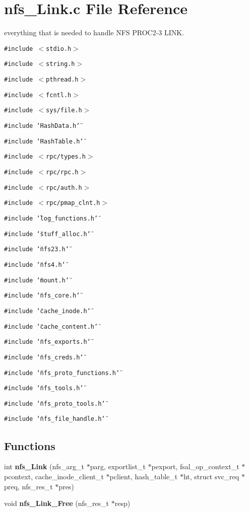\section{nfs\_\-Link.c File Reference}
\label{nfs__Link_8c}
everything that is needed to handle NFS PROC2-3 LINK. 

{\tt \#include $<$stdio.h$>$}\par
{\tt \#include $<$string.h$>$}\par
{\tt \#include $<$pthread.h$>$}\par
{\tt \#include $<$fcntl.h$>$}\par
{\tt \#include $<$sys/file.h$>$}\par
{\tt \#include \char`\"{}Hash\-Data.h\char`\"{}}\par
{\tt \#include \char`\"{}Hash\-Table.h\char`\"{}}\par
{\tt \#include $<$rpc/types.h$>$}\par
{\tt \#include $<$rpc/rpc.h$>$}\par
{\tt \#include $<$rpc/auth.h$>$}\par
{\tt \#include $<$rpc/pmap\_\-clnt.h$>$}\par
{\tt \#include \char`\"{}log\_\-functions.h\char`\"{}}\par
{\tt \#include \char`\"{}stuff\_\-alloc.h\char`\"{}}\par
{\tt \#include \char`\"{}nfs23.h\char`\"{}}\par
{\tt \#include \char`\"{}nfs4.h\char`\"{}}\par
{\tt \#include \char`\"{}mount.h\char`\"{}}\par
{\tt \#include \char`\"{}nfs\_\-core.h\char`\"{}}\par
{\tt \#include \char`\"{}cache\_\-inode.h\char`\"{}}\par
{\tt \#include \char`\"{}cache\_\-content.h\char`\"{}}\par
{\tt \#include \char`\"{}nfs\_\-exports.h\char`\"{}}\par
{\tt \#include \char`\"{}nfs\_\-creds.h\char`\"{}}\par
{\tt \#include \char`\"{}nfs\_\-proto\_\-functions.h\char`\"{}}\par
{\tt \#include \char`\"{}nfs\_\-tools.h\char`\"{}}\par
{\tt \#include \char`\"{}nfs\_\-proto\_\-tools.h\char`\"{}}\par
{\tt \#include \char`\"{}nfs\_\-file\_\-handle.h\char`\"{}}\par
\subsection*{Functions}
\begin{CompactItemize}
\item 
int {\bf nfs\_\-Link} (nfs\_\-arg\_\-t $\ast$parg, exportlist\_\-t $\ast$pexport, fsal\_\-op\_\-context\_\-t $\ast$pcontext, cache\_\-inode\_\-client\_\-t $\ast$pclient, hash\_\-table\_\-t $\ast$ht, struct svc\_\-req $\ast$preq, nfs\_\-res\_\-t $\ast$pres)
\item 
void {\bf nfs\_\-Link\_\-Free} (nfs\_\-res\_\-t $\ast$resp)
\end{CompactItemize}


